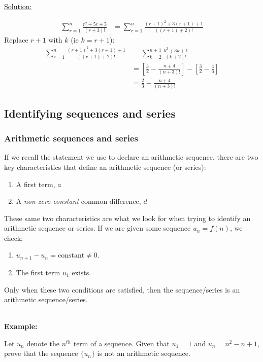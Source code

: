 \documentclass[12pt, a4paper, titlepage]{article}
\begin{document}
\underline{Solution:}

\begin{align*}
    \sum^n_{r = 1} \frac{r^2 + 5r + 5}{(r + 3)!} &= \sum^n_{r = 1} \frac{(r + 1)^2 + 3(r + 1) + 1}{((r + 1) + 2)!}
\end{align*}
Replace $r + 1$ with $k$ (ie $k = r + 1$):
\begin{align*}
    \sum^n_{r = 1} \frac{(r + 1)^2 + 3(r + 1) + 1}{((r + 1) + 2)!} &= \sum^{n + 1}_{k = 2} \frac{k^2 + 3k + 1}{(k + 2)!} \\
    &= [\frac{3}{2} - \frac{n + 4}{(n + 3)!}] - [\frac{3}{2} - \frac{4}{6}] \\
    &= \frac{2}{3} - \frac{n + 4}{(n + 3)!}
\end{align*}

\subsection{Identifying sequences and series}

\subsubsection{Arithmetic sequences and series}

If we recall the statement we use to declare an arithmetic sequence, there are two key characteristics that define an arithmetic sequence (or series):

\begin{enumerate}
    \item A first term, $a$
    \item A \emph{non-zero constant} common difference, $d$
\end{enumerate}

These same two characteristics are what we look for when trying to identify an arithmetic sequence or series. If we are given some sequence $u_n = f(n)$, we check:

\begin{enumerate}
    \item $u_{n + 1} - u_n = \text{constant} \neq 0$.
    \item The first term $u_1$ exists.
\end{enumerate}

Only when these two conditions are satisfied, then the sequence/series is an arithmetic sequence/series.

\textbf{\\ Example:}

Let $u_n$ denote the $n^{th}$ term of a sequence. Given that $u_1 = 1$ and $u_n = n^2 - n + 1$, prove that the sequence $\{u_n\}$ is not an arithmetic sequence.
\end{document}
